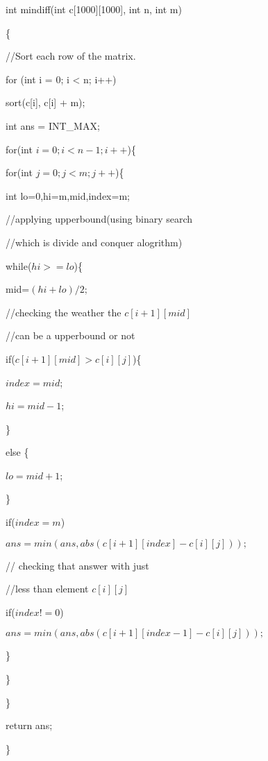 \documentclass[conference]{IEEEtran}
\begin{document}
\begin{adjustwidth}{2em}{0em}
int mindiff(int c[1000][1000], int n, int m)  

\{  

//Sort each row of the matrix.

for (int i = 0; i < n; i++) 

\begin{adjustwidth}{2em}{0em}sort(c[i], c[i] + m);  \end{adjustwidth}

int ans = INT\_MAX;  

for(int $i=0;i<n-1;i++$)\{
\begin{adjustwidth}{2em}{0em}

for(int $j=0;j<m;j++$)\{ 
\begin{adjustwidth}{2em}{0em}

int lo=0,hi=m,mid,index=m; 

//applying upperbound(using binary search   

//which is divide and conquer alogrithm)


while($hi>=lo$)\{
\begin{adjustwidth}{1em}{0em} 

mid=$(hi+lo)/2;$ 

//checking the weather the $c[i+1][mid] $

//can be a upperbound or not 

if($c[i+1][mid]>c[i][j]$)\{ 

$index=mid$; 

$hi=mid-1$; 

\} 

else \{

$lo=mid+1$; 

\} 

if($index\!=m$) 

$ans=min(ans,abs(c[i+1][index]-c[i][j]));$ 

// checking that answer with just 

//less than element $c[i][j]$ 

if($index!=0$) 

$ans=min(ans,abs(c[i+1][index-1]-c[i][j]));$

\} 
\end{adjustwidth}
\}

\end{adjustwidth}

\}\end{adjustwidth}
return ans;  

\}
\end{adjustwidth}
\end{document}
